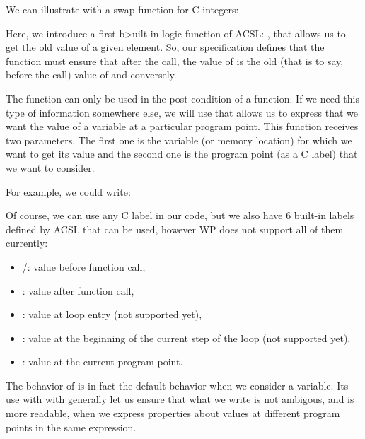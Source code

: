 We can illustrate with a swap function for C integers:








Here, we introduce a first b>uilt-in logic function of ACSL:
, that allows us to get the old value of a given element.
So, our specification defines that the function must ensure that after
the call, the value of  is the old (that is to say, before
the call) value of  and conversely.

The  function can only be used in the
post-condition of a function. If we need this type of information
somewhere else, we will use  that allows us to express that
we want the value of a variable at a particular program point. This
function receives two parameters. The first one is the variable (or
memory location) for which we want to get its value and the second one
is the program point (as a C label) that we want to consider.

For example, we could write:






Of course, we can use any C label in our code, but we also have 6
built-in labels defined by ACSL that can be used, however WP does not
support all of them currently:



\begin{itemize}
\item {}/: value before function call,
\item {}: value after function call,
\item {}: value at loop entry (not supported yet),
\item {}: value at the beginning of the current step of
  the loop (not supported yet),
\item {}: value at the current program point.
\end{itemize}


\begin{Information}
  The behavior of  is in fact the default behavior when we
  consider a variable. Its use with  with
  generally let us ensure that what we write is not ambigous, and is more
  readable, when we express properties about values at different program
  points in the same expression.
\end{Information}


